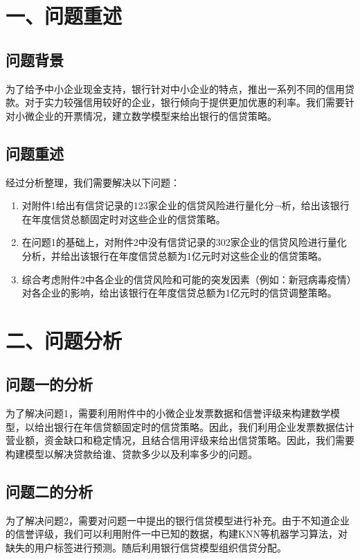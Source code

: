 \documentclass{my_paper}
\begin{document}
\newpage
\section{一、问题重述}

\subsection{问题背景}

为了给予中小企业现金支持，银行针对中小企业的特点，推出一系列不同的信用贷款。对于实力较强信用较好的企业，银行倾向于提供更加优惠的利率。我们需要针对小微企业的开票情况，建立数学模型来给出银行的信贷策略。


\subsection{问题重述}
经过分析整理，我们需要解决以下问题：
\begin{enumerate}
    \item 对附件1给出有信贷记录的123家企业的信贷风险进行量化分¬析，给出该银行在年度信贷总额固定时对这些企业的信贷策略。
    \item 在问题1的基础上，对附件2中没有信贷记录的302家企业的信贷风险进行量化分析，并给出该银行在年度信贷总额为1亿元时对这些企业的信贷策略。
    \item 综合考虑附件2中各企业的信贷风险和可能的突发因素（例如：新冠病毒疫情）对各企业的影响，给出该银行在年度信贷总额为1亿元时的信贷调整策略。
\end{enumerate}

\section{二、问题分析}
\subsection{问题一的分析}

为了解决问题1，需要利用附件中的小微企业发票数据和信誉评级来构建数学模型，以给出银行在年信贷额固定时的信贷策略。因此，我们利用企业发票数据估计营业额，资金缺口和稳定情况，且结合信用评级来给出信贷策略。因此，我们需要构建模型以解决贷款给谁、贷款多少以及利率多少的问题。

\subsection{问题二的分析}
为了解决问题2，需要对问题一中提出的银行信贷模型进行补充。由于不知道企业的信誉评级，我们可以利用附件一中已知的数据，构建KNN等机器学习算法，对缺失的用户标签进行预测。随后利用银行信贷模型组织信贷分配。
\end{document}
